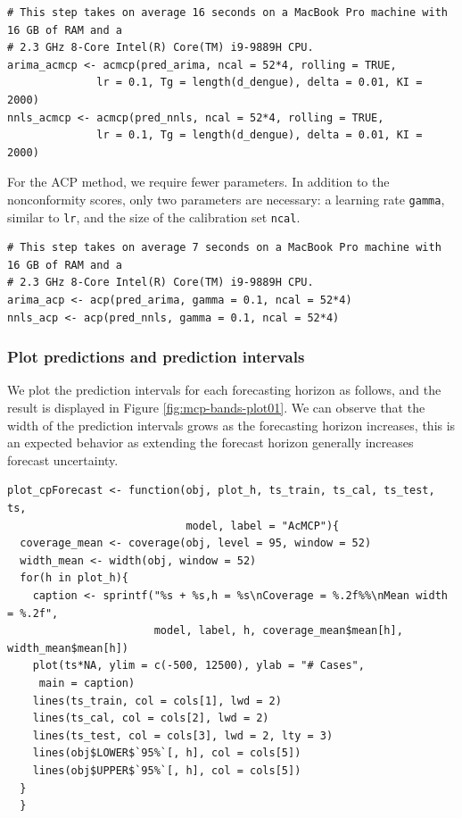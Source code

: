 \begin{verbatim}
# This step takes on average 16 seconds on a MacBook Pro machine with 16 GB of RAM and a 
# 2.3 GHz 8-Core Intel(R) Core(TM) i9-9889H CPU.
arima_acmcp <- acmcp(pred_arima, ncal = 52*4, rolling = TRUE,
              lr = 0.1, Tg = length(d_dengue), delta = 0.01, KI = 2000)
nnls_acmcp <- acmcp(pred_nnls, ncal = 52*4, rolling = TRUE,
              lr = 0.1, Tg = length(d_dengue), delta = 0.01, KI = 2000)
\end{verbatim}

For the ACP method, we require fewer parameters. In addition to the nonconformity scores, only two parameters are necessary: a learning rate \texttt{gamma}, similar to \texttt{lr}, and the size of the calibration set \texttt{ncal}.

\begin{verbatim}
# This step takes on average 7 seconds on a MacBook Pro machine with 16 GB of RAM and a 
# 2.3 GHz 8-Core Intel(R) Core(TM) i9-9889H CPU.
arima_acp <- acp(pred_arima, gamma = 0.1, ncal = 52*4)
nnls_acp <- acp(pred_nnls, gamma = 0.1, ncal = 52*4)
\end{verbatim}

\subsubsection{Plot predictions and prediction intervals}\label{plot-predictions-and-prediction-intervals-1}

We plot the prediction intervals for each forecasting horizon as
follows, and the result is displayed in Figure
\ref{fig:mcp-bands-plot01}. We can observe that the width of the
prediction intervals grows as the forecasting horizon increases, this
is an expected behavior as extending the forecast horizon generally
increases forecast uncertainty.

\begin{verbatim}
plot_cpForecast <- function(obj, plot_h, ts_train, ts_cal, ts_test, ts,
                            model, label = "AcMCP"){
  coverage_mean <- coverage(obj, level = 95, window = 52)
  width_mean <- width(obj, window = 52)
  for(h in plot_h){
    caption <- sprintf("%s + %s,h = %s\nCoverage = %.2f%%\nMean width = %.2f",
                       model, label, h, coverage_mean$mean[h], width_mean$mean[h])
    plot(ts*NA, ylim = c(-500, 12500), ylab = "# Cases",
     main = caption)
    lines(ts_train, col = cols[1], lwd = 2)
    lines(ts_cal, col = cols[2], lwd = 2)
    lines(ts_test, col = cols[3], lwd = 2, lty = 3)
    lines(obj$LOWER$`95%`[, h], col = cols[5])
    lines(obj$UPPER$`95%`[, h], col = cols[5])
  }
  }
\end{verbatim}

